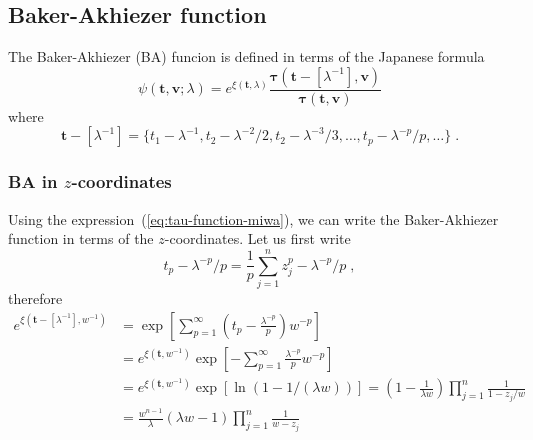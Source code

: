\documentclass[a4paper,12pt]{amsart}
\begin{document}
\subsection{Baker-Akhiezer function}

The Baker-Akhiezer (BA) funcion is defined in terms of the Japanese formula~\cite{Zabrodin2018}
\begin{equation}
  \psi(\bm{t},\bm{v}; \lambda) = e^{\xi(\bm{t}, \lambda)}
  \frac{\bm{\tau}(\bm{t} - [\lambda^{-1}], \bm{v})}{\bm{\tau}(\bm{t}, \bm{v})}
\end{equation}
where 
\begin{equation}
  \bm{t} - [\lambda^{-1}] = 
  \{t_1 - \lambda^{-1}, t_2 - \lambda^{-2}/ 2 ,  t_2 - \lambda^{-3}/3, \dots,  t_p - \lambda^{-p}/p, \dots \}\; .
\end{equation}

\subsubsection{BA in \(z\)-coordinates}
Using the expression~(\ref{eq:tau-function-miwa}), we can write the
Baker-Akhiezer function in terms of the \(z\)-coordinates.
Let us first write
\begin{equation}
  t_p - \lambda^{-p}/p = \frac{1}{p} \sum_{j=1}^n z_j^ p - \lambda^{-p}/p \; , 
\end{equation}
therefore
\begin{equation}
  \begin{split}
    e^{\xi(\bm{t} - [\lambda^{-1}], w^{-1})} & = \exp\left[ \sum_{p=1}^\infty \left(t_p  - \frac{\lambda^{-p}}{p}\right) w^{-p} \right]\\
    & = e^{\xi(\bm{t}, w^{-1})} \exp\left[ - \sum_{p=1}^\infty \frac{\lambda^{-p}}{p} w^{-p} \right] \\
    & = e^{\xi(\bm{t}, w^{-1})} \exp\left[ \ln ( 1 - 1 / (\lambda w)) \right]
      = \left( 1 - \frac{1}{\lambda w}\right)  \prod_{j=1}^n \frac{1}{1 -  z_j /w} \\
    & = \frac{w^{n-1}}{\lambda } \left( \lambda w - 1 \right)  \prod_{j=1}^n \frac{1}{w -  z_j} \\
  \end{split}
\end{equation}
\end{document}
